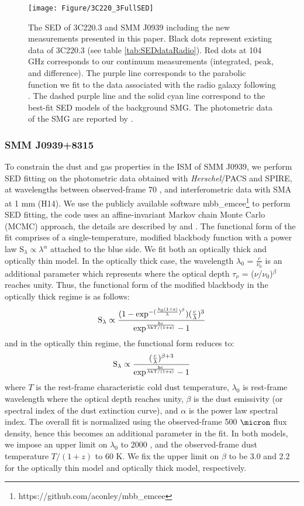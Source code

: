 \documentclass[twocolumn,apj,numberedappendix]{emulateapj}
\begin{document}
\begin{figure}[!tbph]
\centering
\texttt{[image: Figure/3C220\_3FullSED]}
\caption{The SED of 3C220.3 and SMM J0939 including the new measurements presented in this paper. 
Black dots represent existing data of 3C220.3 (see table \ref{tab:SEDdataRadio}). Red dots at 104 GHz corresponds to 
our continuum measurements (integrated, peak, and difference). The purple line corresponds to the parabolic function we 
fit to the data associated with the radio galaxy following \citet{Cleary07a}. The dashed purple line and 
the solid cyan line correspond to the best-fit SED models of the background SMG. The photometric data of the SMG are reported by \citet{Haas14}. \label{fig:SED}}
\end{figure}

\subsubsection{SMM J0939+8315} 
To constrain the dust and gas properties in the ISM of SMM J0939, we perform SED fitting on the
photometric data obtained with {\it Herschel}/PACS and SPIRE, at wavelengths
between observed-frame 70  \micron, and interferometric data with SMA at 1 mm (H14). We use the publicly
available software {\sc mbb\_emcee}\footnote{https://github.com/aconley/mbb\_emcee} to perform SED fitting, the code uses an affine-invariant Markov chain Monte
Carlo (MCMC) approach, the details are described by \citet{Riechers13a} and \citet{Dowell14a}. The
functional form of the fit comprises of a single-temperature, modified blackbody function with a power law S$_{\lambda} \propto \lambda^\alpha
$ attached to the blue
side.
We fit both an optically thick and optically thin model. In the optically thick case, the wavelength $
\lambda_0$ = $\frac{c}{\nu_0}$ is an additional parameter which represents where the optical
depth $\tau_{\nu}$ = ($\nu$/$\nu_0$)$^\beta$ reaches unity. Thus, the functional form of the modified blackbody
in the optically thick regime is as follows:
\begin{equation}
\rm S_{\lambda} \propto \frac{(1-exp^{-(\frac{\lambda_0 (1+z)}{\lambda})^{\beta}})(\frac{c}{\lambda})^3}
{exp^{\frac{hc}{\lambda\rm{kT/(1+z)} } }-1}
\end{equation}
and in the optically thin regime, the functional form reduces to:
\begin{equation}
\rm S_{\lambda} \propto \frac{(\frac{c}{\lambda})^{\beta+3}}{exp^{\frac{hc}{\lambda\rm{kT/(1+z)}}}-1}
\end{equation}
where $T$ is the rest-frame characteristic cold dust temperature, $\lambda_0$ is rest-frame wavelength
where the optical depth reaches unity, $\beta$ is the dust emissivity (or spectral index of the dust extinction
curve), and $\alpha$ is the power law spectral index. The overall fit is normalized using the observed-frame 500
$\micron$ flux density, hence this becomes an additional parameter in the fit. In both models, we impose an upper limit on $
\lambda_0$ to 2000 \micron, and the observed-frame dust temperature $T/(1+z)$ to 60 K. We fix the upper limit on 
$\beta$ to be 3.0 and 2.2 for the optically thin model and optically thick model, respectively.
\end{document}
